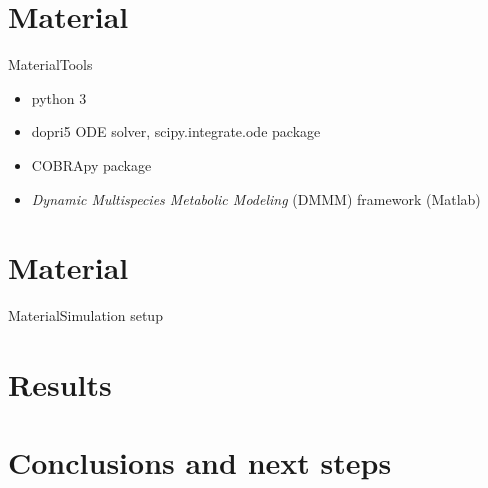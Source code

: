 \documentclass{beamer}
\begin{document}
\section{Material}
\begin{frame}{Material}{Tools}
  
    \begin{itemize}
      \item python 3
      \item dopri5 ODE solver, scipy.integrate.ode package \cite{hairer1993solving}
      \item COBRApy package \cite{heirendt_creation_nodate}
      \item \textit{Dynamic Multispecies Metabolic Modeling} (DMMM) framework (Matlab)\cite{zhuang_design_2012}
    \end{itemize}
% 


  
\end{frame}

\section{Material}
\begin{frame}{Material}{Simulation setup}
  
\end{frame}

\section{Results}
\begin{frame}
  
\end{frame}

\section{Conclusions and next steps}
\begin{frame}
  
\end{frame}
\end{document}
